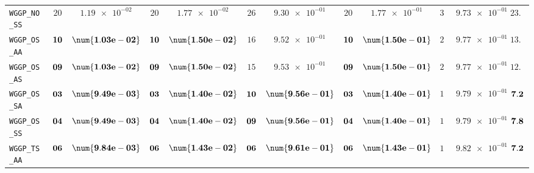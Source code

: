 \begin{xltabular}{\textwidth}{l||cC|cC|cC|cC|cC||c}
	\texttt{WGGP\_NO\_SS} & $ 20$ & $ \num{1.19e-02}$ & $ 20$ & $ \num{1.77e-02}$ & $ 26$ & $ \num{9.30e-01}$ & $ 20$ & $ \num{1.77e-01}$ & $ 30$ & $ \num{9.73e-01}$ & $ 23.2$  \\
	\texttt{WGGP\_OS\_AA} & $\bf 10$ & $\bf \num{1.03e-02}$ & $\bf 10$ & $\bf \num{1.50e-02}$ & $ 16$ & $ \num{9.52e-01}$ & $\bf 10$ & $\bf \num{1.50e-01}$ & $ 22$ & $ \num{9.77e-01}$ & $ 13.6$  \\
	\texttt{WGGP\_OS\_AS} & $\bf 09$ & $\bf \num{1.03e-02}$ & $\bf 09$ & $\bf \num{1.50e-02}$ & $ 15$ & $ \num{9.53e-01}$ & $\bf 09$ & $\bf \num{1.50e-01}$ & $ 21$ & $ \num{9.77e-01}$ & $ 12.6$  \\
	\texttt{WGGP\_OS\_SA} & $\bf 03$ & $\bf \num{9.49e-03}$ & $\bf 03$ & $\bf \num{1.40e-02}$ & $\bf 10$ & $\bf \num{9.56e-01}$ & $\bf 03$ & $\bf \num{1.40e-01}$ & $ 17$ & $ \num{9.79e-01}$ & $\bf 7.2$  \\
	\texttt{WGGP\_OS\_SS} & $\bf 04$ & $\bf \num{9.49e-03}$ & $\bf 04$ & $\bf \num{1.40e-02}$ & $\bf 09$ & $\bf \num{9.56e-01}$ & $\bf 04$ & $\bf \num{1.40e-01}$ & $ 18$ & $ \num{9.79e-01}$ & $\bf 7.8$  \\
	\texttt{WGGP\_TS\_AA} & $\bf 06$ & $\bf \num{9.84e-03}$ & $\bf 06$ & $\bf \num{1.43e-02}$ & $\bf 06$ & $\bf \num{9.61e-01}$ & $\bf 06$ & $\bf \num{1.43e-01}$ & $ 12$ & $ \num{9.82e-01}$ & $\bf 7.2$  \\

\end{xltabular}
